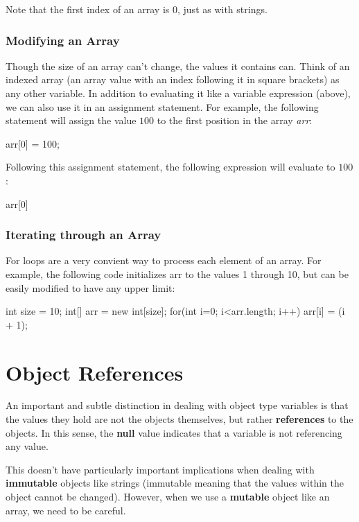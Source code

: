 Note that the first index of an array is 0, just as with strings.

\subsubsection{Modifying an Array}

Though the size of an array can't change, the values it contains can. Think of an indexed array (an array value with an index following it in square brackets) as any other variable. In addition to evaluating it like a variable expression (above), we can also use it in an assignment statement. For example, the following statement will assign the value $100$ to the first position in the array \textit{arr}:

\begin{code}
arr[0] = 100;
\end{code}

Following this assignment statement, the following expression will evaluate to $100$:

\begin{code}
arr[0]
\end{code}


\subsubsection{Iterating through an Array}

For loops are a very convient way to process each element of an array. For example, the following code initializes arr to the values 1 through 10, but can be easily modified to have any upper limit:

\begin{code}
int size = 10;
int[] arr = new int[size];
for(int i=0; i<arr.length; i++) {
  arr[i] = (i + 1);
}
\end{code}


\section{Object References}

An important and subtle distinction in dealing with object type variables is that the values they hold are not the objects themselves, but rather \textbf{references} to the objects. In this sense, the \textbf{null} value indicates that a variable is not referencing any value. 

This doesn't have particularly important implications when dealing with \textbf{immutable} objects like strings (immutable meaning that the values within the object cannot be changed). However, when we use a \textbf{mutable} object like an array, we need to be careful. 

